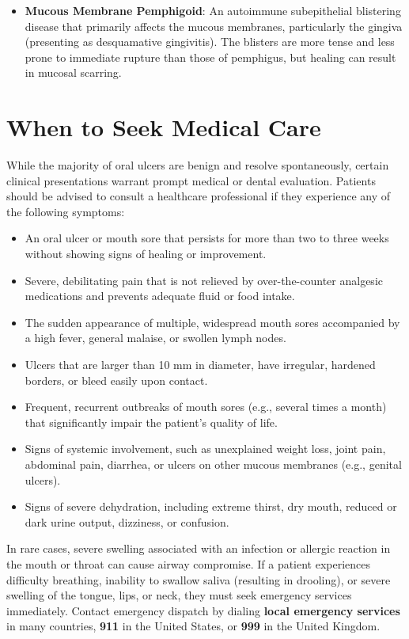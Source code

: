 \begin{itemize}
    \item \textbf{Mucous Membrane Pemphigoid}: An autoimmune subepithelial blistering disease that primarily affects the mucous membranes, particularly the gingiva (presenting as desquamative gingivitis). The blisters are more tense and less prone to immediate rupture than those of pemphigus, but healing can result in mucosal scarring.
\end{itemize}

\section*{When to Seek Medical Care}
While the majority of oral ulcers are benign and resolve spontaneously, certain clinical presentations warrant prompt medical or dental evaluation. Patients should be advised to consult a healthcare professional if they experience any of the following symptoms:
\begin{itemize}
    \item An oral ulcer or mouth sore that persists for more than two to three weeks without showing signs of healing or improvement.
    \item Severe, debilitating pain that is not relieved by over-the-counter analgesic medications and prevents adequate fluid or food intake.
    \item The sudden appearance of multiple, widespread mouth sores accompanied by a high fever, general malaise, or swollen lymph nodes.
    \item Ulcers that are larger than 10 mm in diameter, have irregular, hardened borders, or bleed easily upon contact.
    \item Frequent, recurrent outbreaks of mouth sores (e.g., several times a month) that significantly impair the patient's quality of life.
    \item Signs of systemic involvement, such as unexplained weight loss, joint pain, abdominal pain, diarrhea, or ulcers on other mucous membranes (e.g., genital ulcers).
    \item Signs of severe dehydration, including extreme thirst, dry mouth, reduced or dark urine output, dizziness, or confusion.
\end{itemize}
In rare cases, severe swelling associated with an infection or allergic reaction in the mouth or throat can cause airway compromise. If a patient experiences difficulty breathing, inability to swallow saliva (resulting in drooling), or severe swelling of the tongue, lips, or neck, they must seek emergency services immediately. Contact emergency dispatch by dialing \textbf{local emergency services} in many countries, \textbf{911} in the United States, or \textbf{999} in the United Kingdom.

